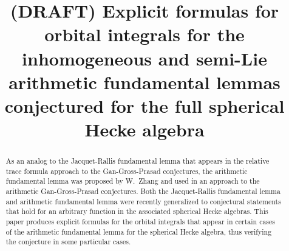 \documentclass[twoside]{mitthesis}
\begin{document}
\title{(DRAFT) Explicit formulas for orbital integrals for the
  inhomogeneous and semi-Lie arithmetic fundamental lemmas
  conjectured for the full spherical Hecke algebra}



\maketitle

\begin{abstract}
  As an analog to the Jacquet-Rallis fundamental lemma that appears in the
  relative trace formula approach to the Gan-Gross-Prasad conjectures,
  the arithmetic fundamental lemma was proposed by W.\ Zhang and used in an approach
  to the arithmetic Gan-Gross-Prasad conjectures.
  Both the Jacquet-Rallis fundamental lemma and arithmetic fundamental lemma
  were recently generalized to conjectural statements that hold
  for an arbitrary function in the associated spherical Hecke algebras.
  This paper produces explicit formulas for the orbital integrals that appear
  in certain cases of the arithmetic fundamental lemma for the spherical Hecke algebra,
  thus verifying the conjecture in some particular cases.
\end{abstract}

\onehalfspacing %



\tableofcontents
\listoffigures
\listoftables

















\printbibliography[title=References,heading=bibintoc]

\appendix
\end{document}
